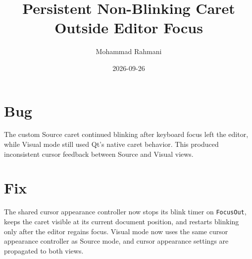 \documentclass[a4paper]{article}
\title{Persistent Non-Blinking Caret Outside Editor Focus}
\date{2026-09-26}
\author{Mohammad Rahmani}
\begin{document}
   \maketitle

   \begin{preview}
      \section{Bug}
      The custom Source caret continued blinking after keyboard focus left the
      editor, while Visual mode still used Qt's native caret behavior.  This
      produced inconsistent cursor feedback between Source and Visual views.

      \section{Fix}
      The shared cursor appearance controller now stops its blink timer on
      \texttt{FocusOut}, keeps the caret visible at its current document
      position, and restarts blinking only after the editor regains focus.
      Visual mode now uses the same cursor appearance controller as Source
      mode, and cursor appearance settings are propagated to both views.
   \end{preview}

   
   
\end{document}
